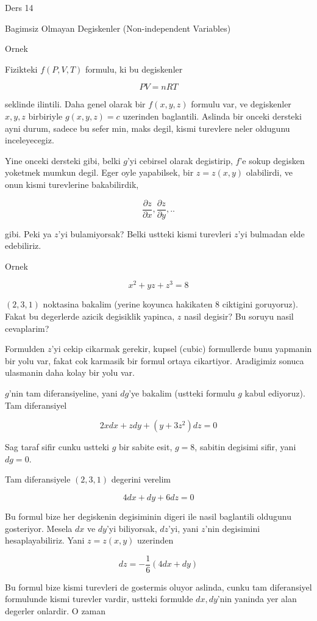 \documentclass[12pt,fleqn]{article}
\begin{document}
Ders 14

Bagimsiz Olmayan Degiskenler (Non-independent Variables)

Ornek

Fizikteki $f(P,V,T)$ formulu, ki bu degiskenler 

\[ PV = nRT \]

seklinde ilintili. Daha genel olarak bir $f(x,y,z)$ formulu var, ve
degiskenler $x,y,z$ birbiriyle $g(x,y,z) = c$ uzerinden baglantili. Aslinda
bir onceki dersteki ayni durum, sadece bu sefer min, maks degil, kismi
turevlere neler oldugunu inceleyecegiz. 

Yine onceki dersteki gibi, belki $g$'yi cebirsel olarak degistirip, $f$'e
sokup degisken yoketmek mumkun degil. Eger oyle yapabilsek, bir $z =
z(x,y)$ 
olabilirdi, ve onun kismi turevlerine bakabilirdik,

\[ \frac{\partial z}{\partial x}, \frac{\partial z}{\partial y}, .. \]

gibi. Peki ya $z$'yi bulamiyorsak? Belki ustteki kismi turevleri $z$'yi
bulmadan elde edebiliriz. 

Ornek

\[ x^2 + yz + z^3 = 8 \]

$(2,3,1)$ noktasina bakalim (yerine koyunca hakikaten 8 ciktigini
goruyoruz). Fakat bu degerlerde azicik degisiklik yapinca, $z$ nasil
degisir? Bu soruyu nasil cevaplarim? 

Formulden $z$'yi cekip cikarmak gerekir, kupsel (cubic) formullerde bunu
yapmanin bir yolu var, fakat cok karmasik bir formul ortaya
cikartiyor. Aradigimiz sonuca ulasmanin daha kolay bir yolu var. 

$g$'nin tam diferansiyeline, yani $dg$'ye bakalim (ustteki formulu $g$
kabul ediyoruz). Tam diferansiyel

\[ 2x dx + z dy + (y+3z^2) dz = 0\]

Sag taraf sifir cunku ustteki $g$ bir sabite esit, $g=8$, sabitin degisimi
sifir, yani $dg=0$. 

Tam diferansiyele $(2,3,1)$ degerini verelim

\[ 4dx + dy + 6dz = 0 \]

Bu formul bize her degiskenin degisiminin digeri ile nasil baglantili
oldugunu gosteriyor. Mesela $dx$ ve $dy$'yi biliyorsak, $dz$'yi, yani
$z$'nin degisimini hesaplayabiliriz. Yani $z=z(x,y)$ uzerinden 

\[ dz = -\frac{1}{6}(4dx + dy) \]

Bu formul bize kismi turevleri de gostermis oluyor aslinda, cunku tam
diferansiyel formulunde kismi turevler vardir, ustteki formulde $dx,dy$'nin
yaninda yer alan degerler onlardir. O zaman
\end{document}
